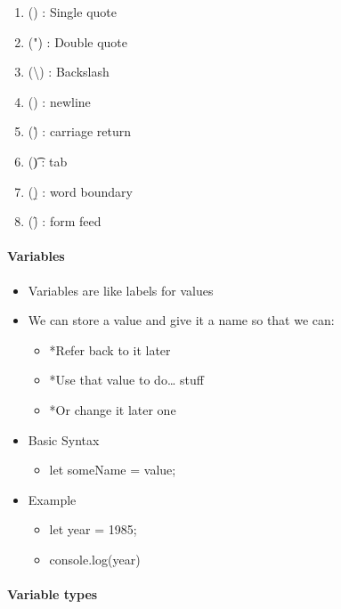 \documentclass[
  paper=a4,
  ,captions=tableheading
]{scrartcl}
\providecommand{\tightlist}{%
  \setlength{\itemsep}{0pt}\setlength{\parskip}{0pt}}
\begin{document}
\begin{itemize}
  \begin{enumerate}
  \def\labelenumi{\arabic{enumi}.}
  \tightlist
  \item
    (\textquotesingle) : Single quote
  \item
    (") : Double quote
  \item
    (\textbackslash) : Backslash
  \item
    (\n) : newline
  \item
    (\r) : carriage return
  \item
    (\t) : tab
  \item
    (\b) : word boundary
  \item
    (\f) : form feed
  \end{enumerate}
\end{itemize}

\hypertarget{variables}{%
\paragraph{Variables}\label{variables}}

\begin{itemize}
\tightlist
\item
  Variables are like labels for values
\item
  We can store a value and give it a name so that we can:

  \begin{itemize}
  \tightlist
  \item
    *Refer back to it later
  \item
    *Use that value to do\ldots{} stuff
  \item
    *Or change it later one
  \end{itemize}
\item
  Basic Syntax

  \begin{itemize}
  \tightlist
  \item
    let someName = value;
  \end{itemize}
\item
  Example

  \begin{itemize}
  \tightlist
  \item
    let year = 1985;
  \item
    console.log(year)
  \end{itemize}
\end{itemize}

\hypertarget{variable-types}{%
\paragraph{Variable types}\label{variable-types}}
\end{document}
